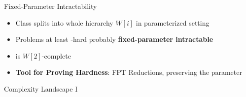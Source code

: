 \begin{frame}[c]{Fixed-Parameter Intractability}
    \begin{itemize}
       \pause \item  Class \NP splits into whole hierarchy $W[i]$ in parameterized setting
       \pause \item Problems at least \WONEhs-hard probably \textbf{fixed-parameter intractable}
       \pause \item \dom is $W[2]$-complete
       \pause \item \textbf{Tool for Proving Hardness}: FPT Reductions, preserving the parameter
    \end{itemize}
\end{frame}

\begin{frame}[c]{Complexity Landscape I}

    \begin{table}
    \centering
\end{table}
\end{frame}
